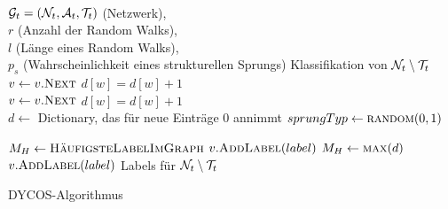 \begin{algorithm}[H]
    \begin{algorithmic}
        \Require \\$\mathcal{G}_t = (\mathcal{N}_t, \mathcal{A}_t, \mathcal{T}_t)$ (Netzwerk),\\
                 $r$ (Anzahl der Random Walks),\\
                 $l$ (Länge eines Random Walks),\\
                 $p_s$ (Wahrscheinlichkeit eines strukturellen Sprungs)
        \Ensure  Klassifikation von $\mathcal{N}_t \setminus \mathcal{T}_t$\\

                \State $v \gets v.\Call{Next}{}$
                    \State $d[w] = d[w] + 1$
                \EndFor
            \EndFor
        \EndProcedure
        \\
                \State $v \gets v.\Call{Next}{}$ 
                    \State $d[w] = d[w] + 1$
                \EndFor
            \EndFor
        \EndProcedure
        \\

            \State $d \gets $ Dictionary, das für neue Einträge 0 annimmt
                \State $sprungTyp \gets \Call{random}{0, 1}$
                    \State {}
                \Else
                    \State {}
                \EndIf
            \EndFor

                \State $M_H \gets \Call{HäufigsteLabelImGraph}{}$
                    \State $v.\Call{AddLabel}{label}$
                \EndFor
            \Else
                \State $M_H \gets \Call{max}{d}$
                    \State $v.\Call{AddLabel}{label}$
                \EndFor
            \EndIf
        \EndFor
        \State \Return Labels für $\mathcal{N}_t \setminus \mathcal{T}_t$
    \end{algorithmic}
\caption{DYCOS-Algorithmus}
\label{alg:DYCOS}
\end{algorithm}

